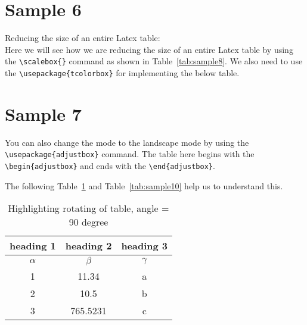 \documentclass{article}
\begin{document}
\section{Sample 6}
Reducing the size of an entire Latex table: \\
Here we will see how we are reducing the size of an entire Latex table by using the \texttt{\textbackslash scalebox\{\}} command as shown in Table~\ref{tab:sample8}. We also need to use the \texttt{\textbackslash usepackage\{tcolorbox\}} for implementing the below table.

\begin{table}[h!]
\centering
{}
\caption{Table to show a reduction of the size of an entire Latex table}
\label{tab:sample8}
\end{table}

\section{Sample 7}
You can also change the mode to the landscape mode by using the \texttt{\textbackslash usepackage\{adjustbox\}} command. The table here begins with the \texttt{\textbackslash begin\{adjustbox\}} and ends with the \texttt{\textbackslash end\{adjustbox\}}.

The following Table~\ref{tab:sample9} and Table~\ref{tab:sample10} help us to understand this.
\begin{table}[h!]
\centering
\begin{adjustbox}{angle=90}
\begin{tabular}{|c|c|c|}
\hline
heading 1 & heading 2 & heading 3 \\
\hline
$\alpha$ & $\beta$ & $\gamma$ \\
1 & 11.34 & a \\
2 & 10.5 & b \\
3 & 765.5231 & c \\
\hline
\end{tabular}
\end{adjustbox}
\caption{Highlighting rotating of table, angle = 90 degree}
\label{tab:sample9}
\end{table}
\end{document}

